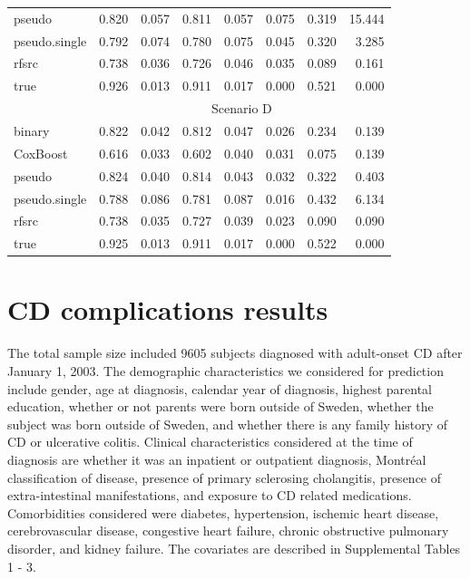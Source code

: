 \documentclass{statsoc}
\begin{document}
\begin{footnotesize}
\begin{table}
\begin{tabular}{lrrrrrrr}
pseudo & 0.820 & 0.057 & 0.811 & 0.057 & 0.075 & 0.319 & 15.444\\
pseudo.single & 0.792 & 0.074 & 0.780 & 0.075 & 0.045 & 0.320 & 3.285\\
rfsrc & 0.738 & 0.036 & 0.726 & 0.046 & 0.035 & 0.089 & 0.161\\
true & 0.926 & 0.013 & 0.911 & 0.017 & 0.000 & 0.521 & 0.000\\
\hline
& \multicolumn{7}{c}{Scenario D} \\
\hline
binary & 0.822 & 0.042 & 0.812 & 0.047 & 0.026 & 0.234 & 0.139\\
CoxBoost & 0.616 & 0.033 & 0.602 & 0.040 & 0.031 & 0.075 & 0.139\\
pseudo & 0.824 & 0.040 & 0.814 & 0.043 & 0.032 & 0.322 & 0.403\\
pseudo.single & 0.788 & 0.086 & 0.781 & 0.087 & 0.016 & 0.432 & 6.134\\
rfsrc & 0.738 & 0.035 & 0.727 & 0.039 & 0.023 & 0.090 & 0.090\\
true & 0.925 & 0.013 & 0.911 & 0.017 & 0.000 & 0.522 & 0.000\\
\hline
\end{tabular}
\end{table}
\end{footnotesize}




\section{CD complications results}

The total sample size included 9605 subjects diagnosed with adult-onset CD after January 1, 2003. The demographic characteristics we considered for prediction include gender, age at diagnosis, calendar year of diagnosis, highest parental education, whether or not parents were born outside of Sweden, whether the subject was born outside of Sweden, and whether there is any family history of CD or ulcerative colitis. Clinical characteristics considered at the time of diagnosis are whether it was an inpatient or outpatient diagnosis, Montréal classification of disease, presence of primary sclerosing cholangitis, presence of extra-intestinal manifestations, and exposure to CD related medications. Comorbidities considered were diabetes, hypertension, ischemic heart disease, cerebrovascular disease, congestive heart failure, chronic obstructive pulmonary disorder, and kidney failure. The covariates are described in Supplemental Tables 1 - 3.
\end{document}
